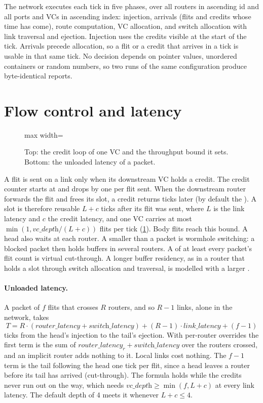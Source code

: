 The network executes each tick in five phases, over all routers in ascending id and all ports and
VCs in ascending index: injection, arrivals (flits and credits whose time has come), route
computation, VC allocation, and switch allocation with link traversal and ejection. Injection uses
the credits visible at the start of the tick. Arrivals precede allocation, so a flit or a credit
that arrives in a tick is usable in that same tick. No decision depends on pointer values,
unordered containers or random numbers, so two runs of the same configuration produce
byte-identical reports.

\section{Flow control and latency}\label{sec:noc-flow}

\begin{figure}[!tbp]\centering
\begin{adjustbox}{max width=\textwidth}\end{adjustbox}
\caption{Top: the credit loop of one VC and the throughput bound it sets. Bottom: the unloaded
latency of a packet.}
\label{fig:noc-credits}
\end{figure}

A flit is sent on a link only when its downstream VC holds a credit. The credit counter starts at
 and drops by one per flit sent. When the downstream router forwards the flit and
frees its slot, a credit returns  ticks later (by default the
). A slot is therefore reusable $L + c$ ticks after its flit was sent, where $L$
is the link latency and $c$ the credit latency, and one VC carries at most
$\min(1, \textit{vc\_depth}/(L+c))$ flits per tick (\cref{fig:noc-credits}). Body flits reach this
bound. A head also waits  at each router. A  smaller than a
packet is wormhole switching: a blocked packet then holds buffers in several routers. A
 of at least every packet's flit count is virtual cut-through. A longer buffer
residency, as in a router that holds a slot through switch allocation and traversal, is modelled
with a larger .

\paragraph{Unloaded latency.} A packet of $f$ flits that crosses $R$ routers, and so $R-1$ links,
alone in the network, takes
\[
T = R\cdot(\textit{router\_latency} + \textit{switch\_latency}) + (R-1)\cdot\textit{link\_latency} + (f-1)
\]
ticks from the head's injection to the tail's ejection. With per-router overrides the first term
is the sum of $\textit{router\_latency}_r + \textit{switch\_latency}$ over the routers crossed,
and an implicit router adds nothing to it. Local links cost nothing. The $f-1$ term
is the tail following the head one tick per flit, since a head leaves a router before its tail
has arrived (cut-through). The formula holds while the credits never run out on the way, which
needs $\textit{vc\_depth} \ge \min(f, L + c)$ at every link latency. The default depth of 4 meets
it whenever $L + c \le 4$.

